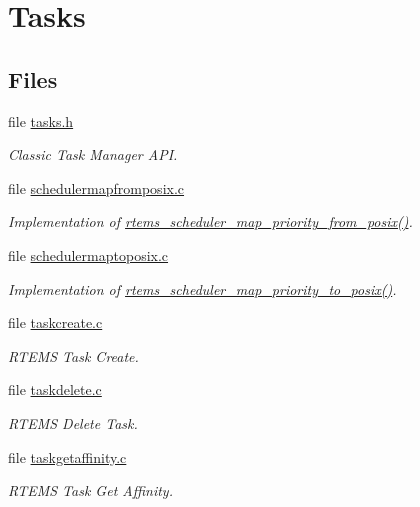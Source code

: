 \hypertarget{group__ClassicTasks}{}\section{Tasks}
\label{group__ClassicTasks}
\subsection*{Files}
\begin{DoxyCompactItemize}
\item 
file \mbox{\hyperlink{tasks_8h}{tasks.\+h}}
\begin{DoxyCompactList}\small\item\em Classic Task Manager A\+PI. \end{DoxyCompactList}\item 
file \mbox{\hyperlink{schedulermapfromposix_8c}{schedulermapfromposix.\+c}}
\begin{DoxyCompactList}\small\item\em Implementation of \mbox{\hyperlink{group__ClassicTasks_ga52b4ea4c1b8bb3a657e75f1c69e24741}{rtems\+\_\+scheduler\+\_\+map\+\_\+priority\+\_\+from\+\_\+posix()}}. \end{DoxyCompactList}\item 
file \mbox{\hyperlink{schedulermaptoposix_8c}{schedulermaptoposix.\+c}}
\begin{DoxyCompactList}\small\item\em Implementation of \mbox{\hyperlink{group__ClassicTasks_ga875f450e05e528d678c06243dbfbda17}{rtems\+\_\+scheduler\+\_\+map\+\_\+priority\+\_\+to\+\_\+posix()}}. \end{DoxyCompactList}\item 
file \mbox{\hyperlink{taskcreate_8c}{taskcreate.\+c}}
\begin{DoxyCompactList}\small\item\em R\+T\+E\+MS Task Create. \end{DoxyCompactList}\item 
file \mbox{\hyperlink{taskdelete_8c}{taskdelete.\+c}}
\begin{DoxyCompactList}\small\item\em R\+T\+E\+MS Delete Task. \end{DoxyCompactList}\item 
file \mbox{\hyperlink{taskgetaffinity_8c}{taskgetaffinity.\+c}}
\begin{DoxyCompactList}\small\item\em R\+T\+E\+MS Task Get Affinity. \end{DoxyCompactList}\item 

\end{DoxyCompactItemize}
